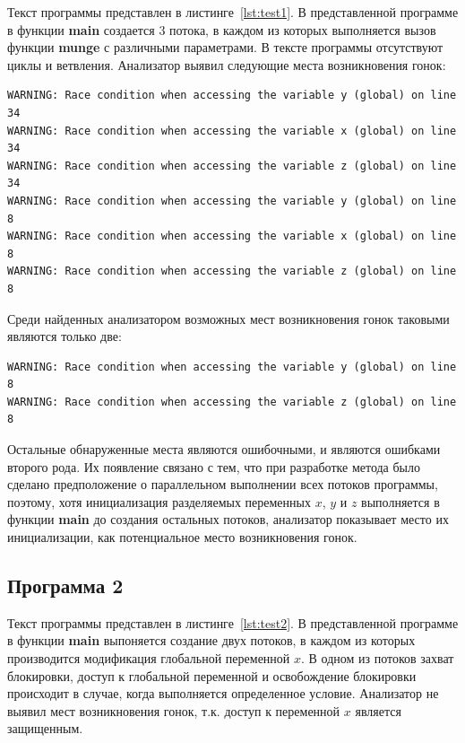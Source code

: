 Текст программы представлен в листинге~\ref{lst:test1}. В представленной программе в функции \textbf{main} создается 3 потока, в каждом из которых выполняется вызов функции \textbf{munge} с различными параметрами. В тексте программы отсутствуют циклы и ветвления. Анализатор выявил следующие места возникновения гонок:
\begin{verbatim}
WARNING: Race condition when accessing the variable y (global) on line 34
WARNING: Race condition when accessing the variable x (global) on line 34
WARNING: Race condition when accessing the variable z (global) on line 34
WARNING: Race condition when accessing the variable y (global) on line 8
WARNING: Race condition when accessing the variable x (global) on line 8
WARNING: Race condition when accessing the variable z (global) on line 8
\end{verbatim}
Среди найденных анализатором возможных мест возникновения гонок таковыми являются только две:
\begin{verbatim}
WARNING: Race condition when accessing the variable y (global) on line 8
WARNING: Race condition when accessing the variable z (global) on line 8
\end{verbatim}
Остальные обнаруженные места являются ошибочными, и являются ошибками второго рода. Их появление связано с тем, что при разработке метода было сделано предположение о параллельном выполнении всех потоков программы, поэтому, хотя инициализация разделяемых переменных $x$, $y$ и $z$ выполняется в функции \textbf{main} до создания остальных потоков, анализатор показывает место их инициализации, как потенциальное место возникновения гонок.



\subsection{Программа 2}

Текст программы представлен в листинге~\ref{lst:test2}. В представленной программе в функции \textbf{main} выпоняется создание двух потоков, в каждом из которых производится модификация глобальной переменной $x$. В одном из потоков захват блокировки, доступ к глобальной переменной и освобождение блокировки происходит в случае, когда выполняется определенное условие. Анализатор не выявил мест возникновения гонок, т.к. доступ к переменной $x$ является защищенным.



